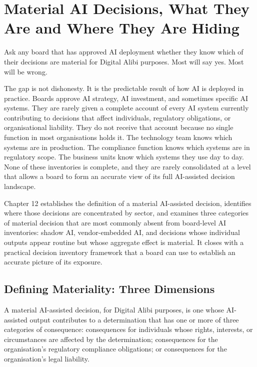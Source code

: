 
\chapter{Material AI Decisions, What They Are and Where They Are Hiding}

Ask any board that has approved AI deployment whether they know which of their decisions are material for Digital Alibi purposes. Most will say yes. Most will be wrong.

The gap is not dishonesty. It is the predictable result of how AI is deployed in practice. Boards approve AI strategy, AI investment, and sometimes specific AI systems. They are rarely given a complete account of every AI system currently contributing to decisions that affect individuals, regulatory obligations, or organisational liability. They do not receive that account because no single function in most organisations holds it. The technology team knows which systems are in production. The compliance function knows which systems are in regulatory scope. The business units know which systems they use day to day. None of these inventories is complete, and they are rarely consolidated at a level that allows a board to form an accurate view of its full AI-assisted decision landscape.

Chapter 12 establishes the definition of a material AI-assisted decision, identifies where those decisions are concentrated by sector, and examines three categories of material decision that are most commonly absent from board-level AI inventories: shadow AI, vendor-embedded AI, and decisions whose individual outputs appear routine but whose aggregate effect is material. It closes with a practical decision inventory framework that a board can use to establish an accurate picture of its exposure.

\scenebreak

\section{Defining Materiality: Three Dimensions}

A material AI-assisted decision, for Digital Alibi purposes, is one whose AI-assisted output contributes to a determination that has one or more of three categories of consequence: consequences for individuals whose rights, interests, or circumstances are affected by the determination; consequences for the organisation's regulatory compliance obligations; or consequences for the organisation's legal liability.

